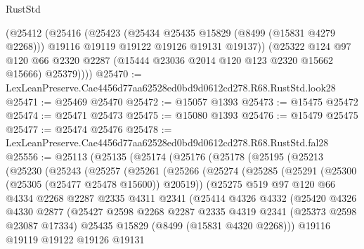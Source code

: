 \begin{lexlean}{RustStd}
\begin{coremodule}
        (@25412
          (@25416
            (@25423
              (@25434 @25435 @15829 (@8499 (@15831 @4279 @2268)))
              @19116
              @19119
              @19122
              @19126
              @19131
              @19137))
          (@25322
            @124
            @97
            @120
            @66
            @2320
            @2287
            (@15444 @23036 @2014 @120 @123 @2320 @15662 @15666)
            @25379))))
@25470 := LexLeanPreserve.Cae4456d77aa62528ed0bd9d0612cd278.R68.RustStd.look28
@25471 := @25469 @25470
@25472 := @15057 @1393
@25473 := @15475 @25472
@25474 := @25471 @25473
@25475 := @15080 @1393
@25476 := @15479 @25475
@25477 := @25474 @25476
@25478 := LexLeanPreserve.Cae4456d77aa62528ed0bd9d0612cd278.R68.RustStd.fal28
@25556 := @25113
    (@25135
      (@25174
        (@25176
          (@25178
            (@25195
              (@25213
                (@25230
                  (@25243
                    (@25257
                      (@25261
                        (@25266
                          (@25274
                            (@25285
                              (@25291 (@25300 (@25305 (@25477 @25478 @15600)) @20519))
                              (@25275
                                @519
                                @97
                                @120
                                @66
                                @4334
                                @2268
                                @2287
                                @2335
                                @4311
                                @2341
                                (@25414
                                  @4326
                                  @4332
                                  (@25420
                                    @4326
                                    @4330
                                    @2877
                                    (@25427
                                      @2598
                                      @2268
                                      @2287
                                      @2335
                                      @4319
                                      @2341
                                      (@25373 @2598 @23087 @17334)
                                      @25435
                                      @15829
                                      (@8499 (@15831 @4320 @2268)))
                                    @19116
                                    @19119
                                    @19122
                                    @19126
                                    @19131

\end{coremodule}
\end{lexlean}
